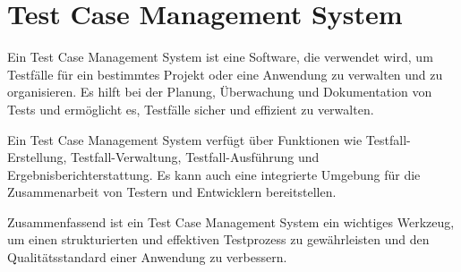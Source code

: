 \clearpage
\section{Test Case Management System}

Ein Test Case Management System ist eine Software, die verwendet wird, um Testfälle für ein bestimmtes Projekt oder eine Anwendung zu verwalten und zu organisieren. Es hilft bei der Planung, Überwachung und Dokumentation von Tests und ermöglicht es, Testfälle sicher und effizient zu verwalten.

\smallskip

Ein Test Case Management System verfügt über Funktionen wie Testfall-Erstellung, Testfall-Verwaltung, Testfall-Ausführung und Ergebnisberichterstattung. Es kann auch eine integrierte Umgebung für die Zusammenarbeit von Testern und Entwicklern bereitstellen.

\smallskip

Zusammenfassend ist ein Test Case Management System ein wichtiges Werkzeug, um einen strukturierten und effektiven Testprozess zu gewährleisten und den Qualitätsstandard einer Anwendung zu verbessern.